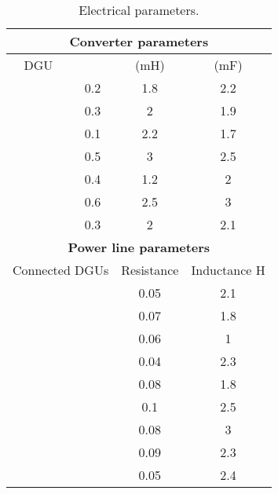 \documentclass[a4paper]{article}
\theoremstyle{plain}
\begin{document}
 \begin{table}[h]
 	\centering
 	\begin{tabular}{*{4}{c}}
 		\toprule
 		\multicolumn{4}{c}{\textbf{Converter parameters}} \\
 		\midrule
 		DGU &   &  (mH) &  (mF)\\
 		\midrule
 		 & 0.2  & 1.8 & 2.2 \\
 		& 0.3 & 2 & 1.9 \\
 		& 0.1 & 2.2 & 1.7 \\
 		& 0.5 & 3 & 2.5 \\
 		& 0.4 & 1.2 & 2 \\
 		& 0.6 & 2.5 & 3 \\
 		& 0.3 & 2 & 2.1 \\
 		\midrule
 		\multicolumn{4}{c}{\textbf{Power line parameters}}\\
 		\toprule
 		\multicolumn{2}{c}{Connected DGUs } & Resistance   & Inductance
 		H \\
 		\midrule
 		\multicolumn{2}{c}{} & 0.05 & 2.1 \\
 		\multicolumn{2}{c}{} & 0.07 & 1.8 \\
 		\multicolumn{2}{c}{} & 0.06 & 1 \\
 		\multicolumn{2}{c}{} & 0.04 & 2.3 \\
 		\multicolumn{2}{c}{} & 0.08 & 1.8 \\
 		\multicolumn{2}{c}{} & 0.1 & 2.5 \\
 		\multicolumn{2}{c}{} & 0.08 & 3 \\
 		\multicolumn{2}{c}{} & 0.09 & 2.3 \\
 		\multicolumn{2}{c}{} & 0.05 & 2.4 \\
 		\bottomrule
 	\end{tabular}
 	\caption{Electrical parameters.}	
 	\label{tbl:Ch5_el_parameters}
 \end{table}
 


 
 
    
     \clearpage


   
     
\end{document}
